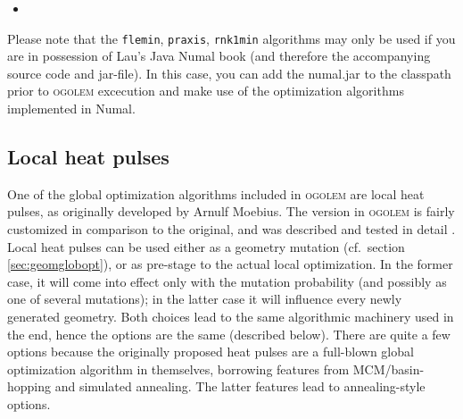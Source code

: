 \documentclass[a4paper,10pt]{scrbook}
\newcommand{\ogo}{\textsc{ogolem}}
\begin{document}
    \begin{itemize}
      \item 
    \end{itemize}


Please note that the \texttt{flemin}, \texttt{praxis}, \texttt{rnk1min} 
algorithms may only be used if you are in possession of Lau's Java Numal 
book\cite{javanumalbook} (and 
therefore the accompanying source code and jar-file). In this case, you can add 
the numal.jar to the classpath prior 
to \ogo{} excecution and make use of the optimization algorithms implemented in 
Numal.

\subsection{Local heat pulses}
\label{sec:localheat}

One of the global optimization algorithms included in \ogo{} are local heat 
pulses, as originally developed by Arnulf Moebius. The version in \ogo{} is
fairly customized in comparison to the original, and was described and tested
in detail \cite{localheat}. Local heat pulses can be used either as a geometry
mutation (cf.~section \ref{sec:geomglobopt}), or as pre-stage to the actual
local optimization. In the former case, it will come into effect only with the
mutation probability (and possibly as one of several mutations); in the latter
case it will influence every newly generated geometry. Both choices lead to
the same algorithmic machinery used in the end, hence the options are the same
(described below). There are quite a few options because the originally
proposed heat pulses are a full-blown global optimization algorithm in
themselves, borrowing features from MCM/basin-hopping and simulated annealing.
The latter features lead to annealing-style options.
\end{document}
